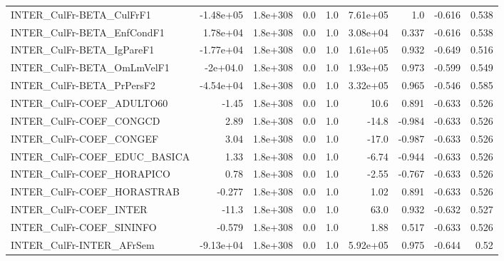 \begin{tabular}{lrrrrrrrr}
INTER\_CulFr-BETA\_CulFrF1              &   -1.48e+05 &     1.8e+308 &     0.0 &      1.0 &   7.61e+05 &         1.0 &       -0.616 &         0.538 \\
INTER\_CulFr-BETA\_EnfCondF1            &    1.78e+04 &     1.8e+308 &     0.0 &      1.0 &   3.08e+04 &       0.337 &       -0.616 &         0.538 \\
INTER\_CulFr-BETA\_IgPareF1             &   -1.77e+04 &     1.8e+308 &     0.0 &      1.0 &   1.61e+05 &       0.932 &       -0.649 &         0.516 \\
INTER\_CulFr-BETA\_OmLmVelF1            &    -2e+04.0 &     1.8e+308 &     0.0 &      1.0 &   1.93e+05 &       0.973 &       -0.599 &         0.549 \\
INTER\_CulFr-BETA\_PrPersF2             &   -4.54e+04 &     1.8e+308 &     0.0 &      1.0 &   3.32e+05 &       0.965 &       -0.546 &         0.585 \\
INTER\_CulFr-COEF\_ADULTO60             &       -1.45 &     1.8e+308 &     0.0 &      1.0 &       10.6 &       0.891 &       -0.633 &         0.526 \\
INTER\_CulFr-COEF\_CONGCD               &        2.89 &     1.8e+308 &     0.0 &      1.0 &      -14.8 &      -0.984 &       -0.633 &         0.526 \\
INTER\_CulFr-COEF\_CONGEF               &        3.04 &     1.8e+308 &     0.0 &      1.0 &      -17.0 &      -0.987 &       -0.633 &         0.526 \\
INTER\_CulFr-COEF\_EDUC\_BASICA          &        1.33 &     1.8e+308 &     0.0 &      1.0 &      -6.74 &      -0.944 &       -0.633 &         0.526 \\
INTER\_CulFr-COEF\_HORAPICO             &        0.78 &     1.8e+308 &     0.0 &      1.0 &      -2.55 &      -0.767 &       -0.633 &         0.526 \\
INTER\_CulFr-COEF\_HORASTRAB            &      -0.277 &     1.8e+308 &     0.0 &      1.0 &       1.02 &       0.891 &       -0.633 &         0.526 \\
INTER\_CulFr-COEF\_INTER                &       -11.3 &     1.8e+308 &     0.0 &      1.0 &       63.0 &       0.932 &       -0.632 &         0.527 \\
INTER\_CulFr-COEF\_SININFO              &      -0.579 &     1.8e+308 &     0.0 &      1.0 &       1.88 &       0.517 &       -0.633 &         0.526 \\
INTER\_CulFr-INTER\_AFrSem              &   -9.13e+04 &     1.8e+308 &     0.0 &      1.0 &   5.92e+05 &       0.975 &       -0.644 &          0.52 \\

\end{tabular}
